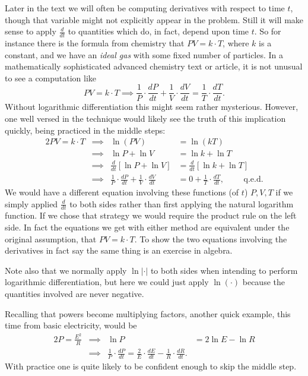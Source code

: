 \bex
Later in the text we will often be computing derivatives with
respect to time $t$, though that variable might not explicitly
appear in the problem.  Still it will make sense to apply
$\frac{d}{dt}$ to quantities which do, in fact, depend upon
time $t$.  So for instance there is the formula from
chemistry that $PV=k\cdot T$, where $k$ is a constant,
and we have an {\it ideal gas} with some fixed number of 
particles.  In a mathematically sophisticated advanced
chemistry text or article, it is not unusual to see
a computation like
$$PV=k\cdot T\implies
\frac1P\cdot\frac{dP}{dt}+\frac1V\cdot\frac{dV}{dt}
=\frac{1}T\cdot\frac{dT}{dt}.$$
Without logarithmic differentiation this might seem rather
mysterious.  However, one well versed in the technique would
likely see the truth of this implication quickly, being
practiced in the middle steps:
\begin{alignat*}{2}
PV=k\cdot T&\implies
&\ln(PV)&=\ln(kT)\\
&\implies&\ln P+\ln V&=\ln k+\ln T\\
&\implies&\frac{d}{dt}\left[\ln P+\ln V\right]&=\frac{d}{dt}
                      \left[\ln k+\ln T\right]\\
&\implies&\frac1P\cdot\frac{dP}{dt}+
          \frac1V\cdot\frac{dV}{dt}&=0+\frac1T\cdot\frac{dT}{dt},
\qquad\text{ q.e.d.}
\end{alignat*}
\label{FirstAppearanceOfPV=kT}
We would have a different equation involving these functions
(of $t$) $P,V,T$ if we simply applied $\frac{d}{dt}$ to both sides
rather than first applying the natural logarithm function.  If we
chose that strategy we would require the product rule on the left
side.  In fact the equations we get with either method are
equivalent under the original assumption, that $PV=k\cdot T$.
To show the two equations involving the derivatives  in fact say
the same thing is an exercise in algebra.

Note also that we normally apply $\ln|\cdot|$ to both sides
when intending to perform logarithmic differentiation, but here we
could just apply $\ln(\cdot)$ because the quantities involved are never
negative.
\eex

Recalling that powers become multiplying factors, another quick
example, this time from basic electricity, would be
\begin{alignat*}{2}
P=\frac{E^2}{R}&\implies&\ln P&=2\ln E-\ln R\\
&\implies&\frac1P\cdot\frac{dP}{dt}
=\frac2{E}\cdot\frac{dE}{dt}-\frac1R\cdot\frac{dR}{dt}.\end{alignat*}
With practice one is quite likely to be confident enough to
skip the middle step.

